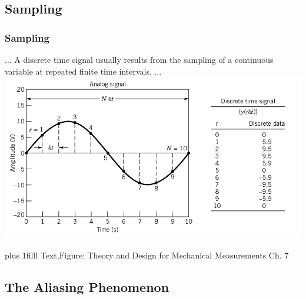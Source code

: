 \documentclass[fleqn]{beamer} %
\newcommand{\sectionIIIsubsectionItitle}{Sampling}
\newcommand{\sectionIIIsubsectionIItitle}{The Aliasing Phenomenon}
\newcommand{\btVFill}{\vskip0pt plus 1filll}
\begin{document}
		\subsection{\sectionIIIsubsectionItitle}\label{sectionIIIsubsectionI}

			\begin{frame}
				\frametitle{\sectionIIIsubsectionItitle}
				\bigskip
						...
						A discrete time signal usually
						results from the sampling of a continuous variable at repeated finite time intervals.
						...	
						\includegraphics[scale=.3]{images/sampling_fig7_1.png}
					
						\btVFill
						\tiny{Text,Figure: Theory and Design for Mechanical Measurements Ch. 7}
			
			\end{frame}

		\subsection{\sectionIIIsubsectionIItitle}\label{sectionIIIsubsectionII}	
\end{document}
